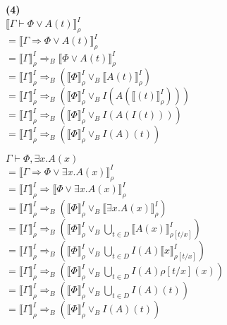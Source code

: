 \documentclass[11pt,letterpaper]{article}
\begin{document}
\textbf{(4)}\\
$\llbracket \Gamma \vdash \Phi \lor A(t) \rrbracket^{I}_ {\rho}$\\
$=\llbracket \Gamma \Rightarrow \Phi \lor A(t) \rrbracket^{I}_ {\rho}$\\
$=\llbracket \Gamma \rrbracket^{I}_ {\rho} \Rightarrow_{B} \llbracket \Phi \lor A(t) \rrbracket^{I}_ {\rho}$\\
$=\llbracket \Gamma \rrbracket^{I}_ {\rho} \Rightarrow_{B} (\llbracket \Phi \rrbracket^{I}_ {\rho} \lor_{B}  \llbracket A(t) \rrbracket^{I}_ {\rho})$\\
$=\llbracket \Gamma \rrbracket^{I}_ {\rho} \Rightarrow_{B}( \llbracket \Phi \rrbracket^{I}_ {\rho} \lor_{B} I ( A (\llbracket (t) \rrbracket^{I}_ {\rho})))$\\
$= \llbracket \Gamma \rrbracket^{I}_ {\rho} \Rightarrow_{B} (\llbracket\Phi \rrbracket^{I}_ {\rho} \lor_{B} I(A(I(t))))$\\
$= \llbracket \Gamma \rrbracket^{I}_ {\rho} \Rightarrow_{B} (\llbracket\Phi \rrbracket^{I}_ {\rho} \lor_{B} I(A)(t))$\\
\vspace{10px}

$\Gamma \vdash \Phi,\exists x.A(x)$\\
$= \llbracket \Gamma \Rightarrow \Phi \lor \exists x.A(x) \rrbracket^{I}_ {\rho}$\\
$= \llbracket \Gamma \rrbracket^{I}_ {\rho} \Rightarrow \llbracket \Phi \lor \exists x.A(x) \rrbracket^{I}_ {\rho}$\\
$= \llbracket \Gamma \rrbracket^{I}_ {\rho} \Rightarrow_{B} (\llbracket\Phi \rrbracket^{I}_ {\rho} \lor_{B} \llbracket \exists x.A(x) \rrbracket^{I}_ {\rho})$\\
$= \llbracket \Gamma \rrbracket^{I}_ {\rho} \Rightarrow_{B} (\llbracket\Phi \rrbracket^{I}_ {\rho} \lor_{B} \bigcup_{t \in D} \llbracket A(x) \rrbracket^{I}_ {\rho[t/x]})$\\
$= \llbracket \Gamma \rrbracket^{I}_ {\rho} \Rightarrow_{B} (\llbracket\Phi \rrbracket^{I}_ {\rho} \lor_{B} \bigcup_{t \in D} I(A)\llbracket x \rrbracket^{I}_ {\rho[t/x]})$\\
$= \llbracket \Gamma \rrbracket^{I}_ {\rho} \Rightarrow_{B} (\llbracket\Phi \rrbracket^{I}_ {\rho} \lor_{B} \bigcup_{t \in D} I(A) {\rho[t/x]}(x))$\\
$= \llbracket \Gamma \rrbracket^{I}_ {\rho} \Rightarrow_{B} (\llbracket\Phi \rrbracket^{I}_ {\rho} \lor_{B} \bigcup_{t \in D} I(A)(t))$\\
$= \llbracket \Gamma \rrbracket^{I}_ {\rho} \Rightarrow_{B} (\llbracket\Phi \rrbracket^{I}_ {\rho} \lor_{B} I(A)(t))$\\
\end{document}
